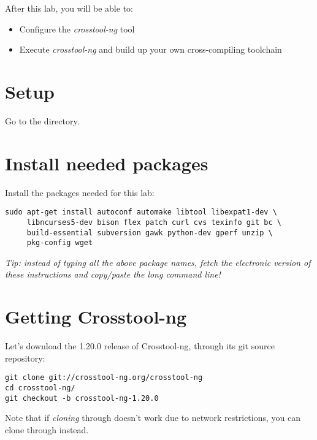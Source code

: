 
After this lab, you will be able to:

\begin{itemize}
\item Configure the {\em crosstool-ng} tool
\item Execute {\em crosstool-ng} and build up your own cross-compiling toolchain
\end{itemize}

\section{Setup}

Go to the  directory.

\section{Install needed packages}

Install the packages needed for this lab:

\begin{verbatim}
sudo apt-get install autoconf automake libtool libexpat1-dev \
     libncurses5-dev bison flex patch curl cvs texinfo git bc \
     build-essential subversion gawk python-dev gperf unzip \
     pkg-config wget
\end{verbatim}

{\em Tip: instead of typing all the above package names, fetch the
electronic version of these instructions and copy/paste the 
long command line!}

\section{Getting Crosstool-ng}

Let's download the 1.20.0 release of Crosstool-ng, through its git
source repository: 

\begin{verbatim}
git clone git://crosstool-ng.org/crosstool-ng
cd crosstool-ng/
git checkout -b crosstool-ng-1.20.0
\end{verbatim}

Note that if {\em cloning} through  doesn't work due to
network restrictions, you can clone through  instead.

